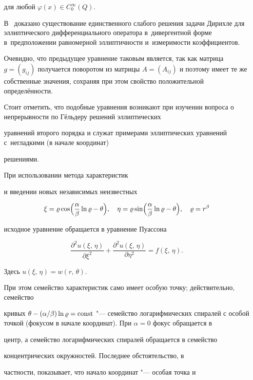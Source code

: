 для любой $ \varphi(x) \in C_0^\infty(Q) $. 

В~\cite{bogan:bib5} доказано существование единственного слабого решения задачи Дирихле для эллиптического дифференциального оператора в~дивергентной форме в~предположении равномерной эллиптичности и~измеримости коэффициентов. 

Очевидно, что предыдущее уравнение таковым является, так как матрица $ g=(g_{ij})$ получается поворотом из  матрицы $ A=(A_{ij})$ и поэтому имеет те же собственные значения, сохраняя при этом свойство положительной определённости.



Стоит отметить, что подобные уравнения возникают при изучении вопроса о непрерывности по Гёльдеру  решений эллиптических

уравнений второго порядка \cite{bogan:bib6} и служат примерами эллиптических уравнений с~негладкими (в начале координат)

решениями. 

При использовании метода характеристик

\cite{bogan:bib2} и введении новых независимых неизвестных

\[

 \xi= \varrho\cos \Bigl( \dfrac{\alpha}{\beta} \ln \varrho - \theta \Bigr), \quad

 \eta= \varrho \sin \Bigl( \dfrac{\alpha}{\beta} \ln \varrho - \theta \Bigr), \quad \varrho=r^\beta

 \]

исходное  уравнение обращается в уравнение Пуассона

\[

 \dfrac{\partial^2 u(\xi,\,\eta)}{\partial \xi^2}+\dfrac{\partial^2 u(\xi,\, \eta)}{\partial \eta^2}= f(\xi,\, \eta).

  \]

Здесь $u(\xi,\,\eta)=w(r,\, \theta)$. 

При этом семейство характеристик само имеет особую точку; действительно, семейство

кривых $\theta- ({\alpha}/{\beta}) \ln \varrho ={\rm const}$ "--- семейство логарифмических спиралей с особой точкой (фокусом в начале координат). При $\alpha =0$ фокус обращается в

центр, а семейство логарифмических спиралей обращается в семейство

концентрических окружностей. Последнее обстоятельство, в

частности, показывает, что начало координат "--- особая точка и


